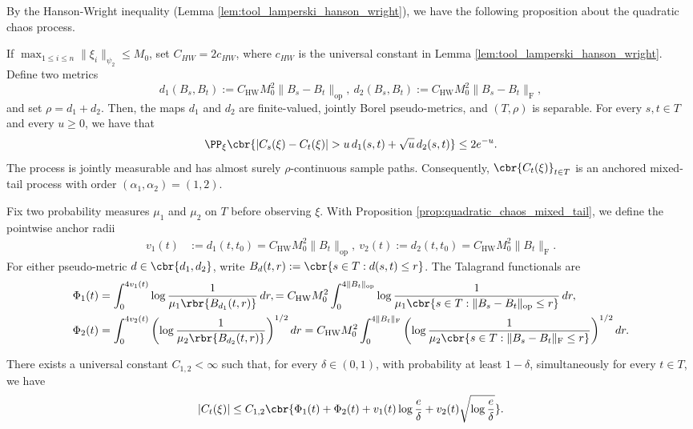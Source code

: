 \documentclass[11pt]{article}
\begin{document}
By the Hanson-Wright inequality (Lemma \ref{lem:tool_lamperski_hanson_wright}), we have the following proposition about the quadratic chaos process.



\begin{proposition}
\label{prop:quadratic_chaos_mixed_tail}
If $\max_{1\le i\le n}\|\xi_i\|_{\psi_2}\le M_0$, set $C_{HW}=2c_{HW}$, where $c_{HW}$ is the universal constant in Lemma \ref{lem:tool_lamperski_hanson_wright}. Define two metrics
\[
d_1(B_s,B_t):=C_{\mathrm{HW}}M_0^2
\|B_s-B_t\|_{\mathrm{op}},\ d_2(B_s,B_t):=C_{\mathrm{HW}}M_0^2
\|B_s-B_t\|_{\mathrm F},
\]
and set $\rho=d_1+d_2$. Then, the maps $d_1$ and $d_2$ are finite-valued,
jointly Borel pseudo-metrics, and $(T,\rho)$ is separable. 
For every $s,t\in T$ and every $u\ge0$, we have that
\begin{align*}
\PP_\xi\cbr{
|C_s(\xi)-C_t(\xi)|
>
u\,d_1(s,t)
+\sqrt{u}\,d_2(s,t)
}
\le2e^{-u}.
\end{align*}
The process is jointly measurable and has almost surely
$\rho$-continuous sample paths. Consequently,
$\cbr{C_t(\xi)}_{t\in T}$ is an anchored mixed-tail process
with order $(\alpha_1,\alpha_2)=(1,2)$.
\end{proposition}
Fix two probability measures $\mu_1$ and
$\mu_2$ on $T$ before observing $\xi$. With Proposition \ref{prop:quadratic_chaos_mixed_tail}, we define the pointwise anchor radii
\begin{align*}
v_1(t)
&:=
d_1(t,t_0)
=
C_{\mathrm{HW}}M_0^2\|B_t\|_{\mathrm{op}},\ 
v_2(t):=
d_2(t,t_0)
=C_{\mathrm{HW}}M_0^2\|B_t\|_{\mathrm F}.
\end{align*}
For either pseudo-metric $d\in\cbr{d_1,d_2}$,
write $B_d(t,r)
:=
\cbr{s\in T:d(s,t)\le r}$. The Talagrand functionals are
\begin{align*}
\Phi_{1}(t)
&=\int_0^{4v_{1}(t)}
\log\frac{1}{
\mu_{1}
\rbr{
B_{d_{1}}(t,r)
}
}\,dr,=
C_{\mathrm{HW}}M_0^2
\int_0^{4\|B_t\|_{\mathrm{op}}}
\log\frac{1}{
\mu_{1}
\cbr{
s\in T:
\|B_s-B_t\|_{\mathrm{op}}\le r
}
}\,dr,\\
\Phi_{2}(t)
&=\int_0^{4v_{2}(t)}
\left(
\log\frac{1}{
\mu_{2}
\rbr{
B_{d_{2}}(t,r)
}
}
\right)^{1/2}dr=
C_{\mathrm{HW}}M_0^2
\int_0^{4\|B_t\|_{\mathrm F}}
\left(
\log\frac{1}{
\mu_{2}
\cbr{
s\in T:
\|B_s-B_t\|_{\mathrm F}\le r
}
}
\right)^{1/2}dr.
\end{align*}

\begin{corollary}
\label{cor:quadratic_chaos_pointwise_envelope}
There exists a universal constant $C_{1,2}<\infty$ such that, for every
$\delta\in(0,1)$, with probability at least $1-\delta$,
simultaneously for every $t\in T$, we have
\begin{align*}
|C_t(\xi)|
\le
C_{1,2}
\cbr{
\Phi_{1}(t)
+\Phi_{2}(t)
+v_{1}(t)\log\frac{e}{\delta}
+v_{2}(t)
\sqrt{\log\frac{e}{\delta}}
}.
\end{align*}
\end{corollary}
\end{document}
